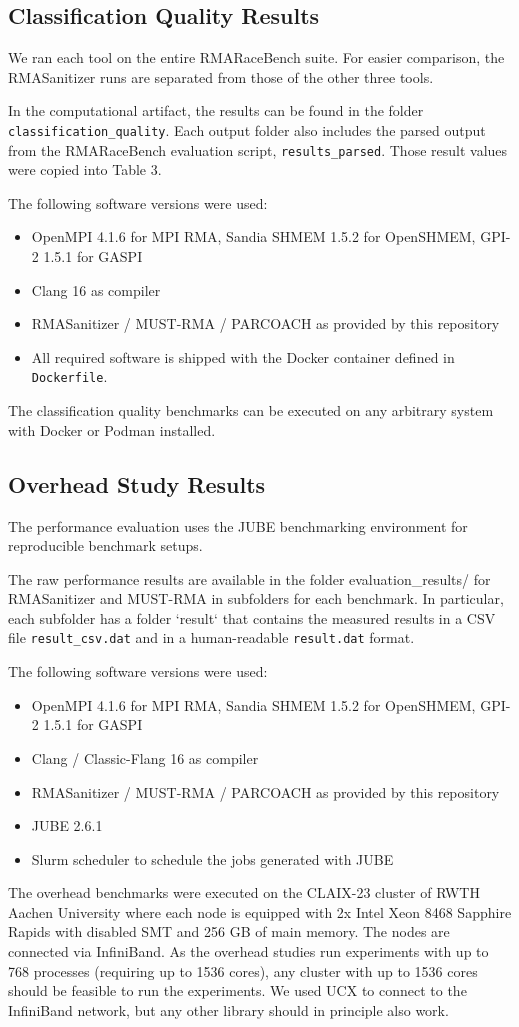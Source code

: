 \documentclass[twoside]{article}
\begin{document}
\subsection*{Classification Quality Results}
We ran each tool on the entire RMARaceBench suite. 
For easier comparison, the RMASanitizer runs are separated from those of the other three tools.

In the computational artifact, the results can be found in the folder \texttt{classification\_quality}.
Each output folder also includes the parsed output from the RMARaceBench evaluation script, \texttt{results\_parsed}.
Those result values were copied into Table 3.

The following software versions were used:
\begin{itemize}
\item OpenMPI 4.1.6 for MPI RMA, Sandia SHMEM 1.5.2 for OpenSHMEM, GPI-2 1.5.1 for GASPI
\item Clang 16 as compiler
\item RMASanitizer / MUST-RMA / PARCOACH as provided by this repository
\item All required software is shipped with the Docker container defined in \texttt{Dockerfile}.
\end{itemize}

The classification quality benchmarks can be executed on any arbitrary system with Docker or Podman installed.


\subsection*{Overhead Study Results}
The performance evaluation uses the JUBE benchmarking environment for reproducible benchmark setups.

The raw performance results are available in the folder evaluation\_results/ for RMASanitizer and MUST-RMA in subfolders for each benchmark. In particular, each subfolder has a folder `result` that contains the measured results in a CSV file \texttt{result\_csv.dat} and in a human-readable \texttt{result.dat} format.

The following software versions were used:
\begin{itemize}
\item OpenMPI 4.1.6 for MPI RMA, Sandia SHMEM 1.5.2 for OpenSHMEM, GPI-2 1.5.1 for GASPI
\item Clang / Classic-Flang 16 as compiler
\item RMASanitizer / MUST-RMA / PARCOACH as provided by this repository
\item JUBE 2.6.1
\item Slurm scheduler to schedule the jobs generated with JUBE
\end{itemize}

The overhead benchmarks were executed on the CLAIX-23 cluster of RWTH Aachen University where each node is equipped with 2x Intel Xeon 8468 Sapphire Rapids with disabled SMT and 256 GB of main memory. The nodes are connected via InfiniBand. As the overhead studies run experiments with up to 768 processes (requiring up to 1536 cores), any cluster with up to 1536 cores should be feasible to run the experiments. We used UCX to connect to the InfiniBand network, but any other library should in principle also work.
\end{document}
